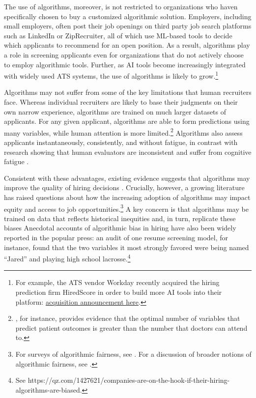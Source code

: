 \documentclass[crop,noquery,editorname,historyrev,nosurname,runningno,sepcount]{RESTUD}
\begin{document}
The use of algorithms, moreover, is not restricted to organizations who haven specifically chosen to buy a customized algorithmic solution.  Employers, including small employers, often post their job openings on third party job search platforms such as LinkedIn or ZipRecruiter, all of which use ML-based tools to decide which applicants to recommend for an open position.  As a result, algorithms play a role in screening applicants even for organizations that do not actively choose to employ algorithmic tools.  Further, as AI tools become increasingly integrated with widely used ATS systems, the use of algorithms is likely to grow.\footnote{For example, the ATS vendor Workday recently acquired the hiring prediction firm HiredScore in order to build more AI tools into their platform: \href{https://investor.workday.com/2024-02-26-Workday-Announces-Intent-to-Acquire-HiredScore}{acquisition announcement here}.}

Algorithms may not suffer from some of the key limitations that human recruiters face.  Whereas individual recruiters are likely to base their judgments on their own narrow experience, algorithms are trained on much larger datasets of applicants.  For any given applicant, algorithms are able to form predictions using many variables, while human attention is more limited.\footnote{\citet{mullainathanobermeyer2019}, for instance, provides evidence that the optimal number of variables that predict patient outcomes is greater than the number that doctors can attend to.}  Algorithms also assess applicants instantaneously, consistently, and without fatigue, in contrast with research showing that human evaluators are inconsistent and suffer from cognitive fatigue \citep{GABAIX2019261, HIRSHLEIFER201983}.  

Consistent with these advantages, existing evidence suggests that algorithms may improve the quality of hiring decisions \citep{hoffman2018, cowgill2020}. Crucially, however, a growing literature has raised questions about how the increasing adoption of algorithms may impact equity and access to job opportunities.\footnote{For surveys of algorithmic fairness, see \citet{bakalar2021fairness, barocas_big_2016, corbett-davies_measure_2018, cowgilltucker2019}.  For a discussion of broader notions of algorithmic fairness, see \citet{kasyabebe, kleinberg_inherent_2016}.}  
A key concern is that algorithms may be trained on data that reflects historical inequities and, in turn, replicate these biases \citep{obermeyer2019, lambrecht} 
Anecdotal accounts of algorithmic bias in hiring have also been widely reported in the popular press: an audit of one resume screening model, for instance, found that the two variables it most strongly favored were being named ``Jared'' and playing high school lacrosse.\footnote{See https://qz.com/1427621/companies-are-on-the-hook-if-their-hiring-algorithms-are-biased.}  
\end{document}
